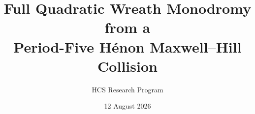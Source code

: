 \documentclass[11pt]{article}
\title{Full Quadratic Wreath Monodromy from a\\
Period-Five H\'enon Maxwell--Hill Collision}
\author{HCS Research Program}
\date{12 August 2026}
\theoremstyle{definition}
\theoremstyle{remark}
\begin{document}
\maketitle

\begin{abstract}

\end{abstract}












\appendix

\end{document}
